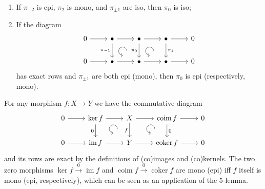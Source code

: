 \documentclass[english,letterpaper]{article}%
\numberwithin{equation}{section}
\numberwithin{figure}{section}
\numberwithin{table}{section}
\theoremstyle{definition}
\theoremstyle{definition}
\theoremstyle{definition}
\theoremstyle{plain}
\theoremstyle{plain}
\theoremstyle{plain}
\theoremstyle{plain}
\theoremstyle{remark}
\theoremstyle{remark}
\DeclareMathOperator{\im}{im}
\DeclareMathOperator{\coker}{coker}
\DeclareMathOperator{\coim}{coim}
\begin{document}
\begin{cor}
    \begin{enumerate}
        \item If $\pi_{-2}$ is epi, $\pi_2$ is mono, and $\pi_{\pm 1}$ are iso, then $\pi_0$ is iso;
        \item If the diagram
        \[\begin{tikzcd}[every matrix/.append style={name=m},   
        execute at end picture={\draw [<-] ([xshift=-8mm,yshift=-10mm]m-1-3.north) arc[start angle=-90,delta angle=-270,radius=0.2cm];
        \draw [<-] ([xshift=-8mm,yshift=-10mm]m-1-4.north) arc[start angle=-90,delta angle=-270,radius=0.2cm];}]
        0\arrow[r] & \bullet\arrow[r]\arrow[d,swap,"\pi_{-1}"] & \bullet \arrow[r]\arrow[d,swap,"\pi_0"] & \bullet\arrow[d,"\pi_1"]\arrow[r] & 0 \\
       0\arrow[r] & \bullet\arrow[r] & \bullet\arrow[r] &\bullet \arrow[r] &0
    \end{tikzcd}\]
    has exact rows and $\pi_{\pm 1}$ are both epi (mono), then $\pi_0$ is epi (respectively, mono).
    \end{enumerate}
\end{cor}

\begin{example}
    For any morphism $f:X\to Y$ we have the commutative diagram
    \[\begin{tikzcd}[every matrix/.append style={name=m},   
        execute at end picture={\draw [<-] ([xshift=-8mm,yshift=-10mm]m-1-3.north) arc[start angle=-90,delta angle=-270,radius=0.2cm];
        \draw [<-] ([xshift=-8mm,yshift=-10mm]m-1-4.north) arc[start angle=-90,delta angle=-270,radius=0.2cm];}]
        0\arrow[r] & \ker f \arrow[r]\arrow[d,swap,"0"] & X \arrow[r]\arrow[d,swap,"f"] & \coim f\arrow[d,"0"]\arrow[r] & 0 \\
       0\arrow[r] & \im f\arrow[r] & Y\arrow[r] &\coker f \arrow[r] &0
    \end{tikzcd}\]
    and its rows are exact by the definitions of (co)images and (co)kernels. The two zero morphisms $\ker f\overset{0}{\to} \im f$ and $\coim f\overset{0}{\to} \coker f$ are mono (epi) iff $f$ itself is mono (epi, respectively), which can be seen as an application of the 5-lemma.
\end{example}
\end{document}
